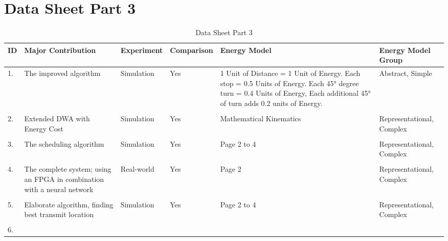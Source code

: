 \section{Data Sheet Part 3}
\label{appendix:data_sheet_3}

\begin{table}[h]
    \centering
    \caption{Data Sheet Part 3}
    \begin{tabular}{p{0.1cm}p{5cm}p{2cm}p{2cm}p{3.5cm}p{3cm}}
        \toprule
            {ID} &
                {Major Contribution} &
                {Experiment}         &
                {Comparison}         &
                {Energy Model}       &
                {Energy Model Group} \\
        \midrule
            {1.} &
                {The improved algorithm} &
                {Simulation} &
                {Yes} &
                {1 Unit of Distance = 1 Unit of Energy.
                Each stop = 0.5 Units of Energy.
                Each 45° degree turn = 0.4 Units of Energy,
                Each additional 45° of turn adds 0.2 units of Energy.} &
                {Abstract, Simple} \\
            \hline
            \\
            {2.} &
                {Extended DWA with Energy Cost} &
                {Simulation} &
                {Yes} &
                {Mathematical Kinematics} &
                {Representational, Complex} \\
            \hline
            \\
            {3.} &
                {The scheduling algorithm} &
                {Simulation} &
                {Yes} &
                {Page 2 to 4} &
                {Representational, Complex} \\
            \hline
            \\
            {4.} &
                {The complete system; using an FPGA in combination with a neural network} &
                {Real-world} &
                {Yes} &
                {Page 2} &
                {Representational, Complex} \\
            \hline
            \\
            {5.} &
                {Elaborate algorithm, finding best transmit location} &
                {Simulation} &
                {Yes} &
                {Page 2 to 4} &
                {Representational, Complex} \\
            \hline
            \\
            {6.} &

\end{tabular}
\end{table}

